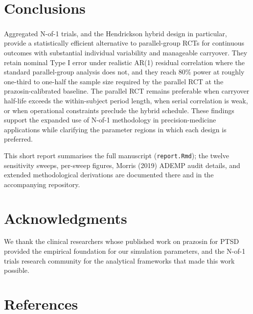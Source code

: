 \documentclass[
  11pt,
]{article}
\begin{document}
\section{Conclusions}\label{conclusions}

Aggregated N-of-1 trials, and the
Hendrickson\textsuperscript{}
hybrid design in particular, provide a statistically efficient
alternative to parallel-group RCTs for continuous outcomes with
substantial individual variability and manageable carryover. They retain
nominal Type I error under realistic AR(1) residual correlation where
the standard parallel-group analysis does not, and they reach 80\% power
at roughly one-third to one-half the sample size required by the
parallel RCT at the prazosin-calibrated baseline. The parallel RCT
remains preferable when carryover half-life exceeds the within-subject
period length, when serial correlation is weak, or when operational
constraints preclude the hybrid schedule. These findings support the
expanded use of N-of-1 methodology in precision-medicine applications
while clarifying the parameter regions in which each design is
preferred.

This short report summarises the full manuscript (\texttt{report.Rmd});
the twelve sensitivity sweeps, per-sweep figures, Morris (2019) ADEMP
audit details, and extended methodological derivations are documented
there and in the accompanying repository.

\section{Acknowledgments}\label{acknowledgments}

We thank the clinical researchers whose published work on prazosin for
PTSD provided the empirical foundation for our simulation parameters,
and the N-of-1 trials research community for the analytical frameworks
that made this work possible.

\section{References}\label{references}
\end{document}
